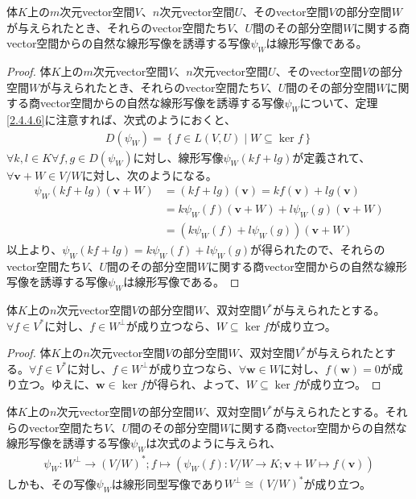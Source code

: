 \documentclass[dvipdfmx]{jsarticle}
\begin{document}
\begin{thm}\label{2.4.4.7}
体$K$上の$m$次元vector空間$V$、$n$次元vector空間$U$、そのvector空間$V$の部分空間$W$が与えられたとき、それらのvector空間たち$V$、$U$間のその部分空間$W$に関する商vector空間からの自然な線形写像を誘導する写像$\psi_{W}$は線形写像である。
\end{thm}
\begin{proof}
体$K$上の$m$次元vector空間$V$、$n$次元vector空間$U$、そのvector空間$V$の部分空間$W$が与えられたとき、それらのvector空間たち$V$、$U$間のその部分空間$W$に関する商vector空間からの自然な線形写像を誘導する写像$\psi_{W}$について、定理\ref{2.4.4.6}に注意すれば、次式のようにおくと、
\begin{align*}
D\left( \psi_{W} \right) = \left\{ f \in L(V,U) \middle| W \subseteq \ker f \right\}
\end{align*}
$\forall k,l \in K\forall f,g \in D\left( \psi_{W} \right)$に対し、線形写像$\psi_{W}(kf + lg)$が定義されて、$\forall\mathbf{v} + W \in {V}/{W}$に対し、次のようになる。
\begin{align*}
\psi_{W}(kf + lg)\left( \mathbf{v} + W \right) &= (kf + lg)\left( \mathbf{v} \right) = kf\left( \mathbf{v} \right) + lg\left( \mathbf{v} \right)\\
&= k\psi_{W}(f)\left( \mathbf{v} + W \right) + l\psi_{W}(g)\left( \mathbf{v} + W \right)\\
&= \left( k\psi_{W}(f) + l\psi_{W}(g) \right)\left( \mathbf{v} + W \right)
\end{align*}
以上より、$\psi_{W}(kf + lg) = k\psi_{W}(f) + l\psi_{W}(g)$が得られたので、それらのvector空間たち$V$、$U$間のその部分空間$W$に関する商vector空間からの自然な線形写像を誘導する写像$\psi_{W}$は線形写像である。
\end{proof}
\begin{thm}\label{2.4.4.8}
体$K$上の$n$次元vector空間$V$の部分空間$W$、双対空間$V^{*}$が与えられたとする。$\forall f \in V^{*}$に対し、$f \in W^{\bot}$が成り立つなら、$W \subseteq \ker f$が成り立つ。
\end{thm}
\begin{proof}
体$K$上の$n$次元vector空間$V$の部分空間$W$、双対空間$V^{*}$が与えられたとする。$\forall f \in V^{*}$に対し、$f \in W^{\bot}$が成り立つなら、$\forall\mathbf{w} \in W$に対し、$f\left( \mathbf{w} \right) = 0$が成り立つ。ゆえに、$\mathbf{w} \in \ker f$が得られ、よって、$W \subseteq \ker f$が成り立つ。
\end{proof}
\begin{thm}\label{2.4.4.9}
体$K$上の$n$次元vector空間$V$の部分空間$W$、双対空間$V^{*}$が与えられたとする。それらのvector空間たち$V$、$U$間のその部分空間$W$に関する商vector空間からの自然な線形写像を誘導する写像$\psi_{W}$は次式のように与えられ、
\begin{align*}
\psi_{W}:W^{\bot} \rightarrow \left( {V}/{W} \right)^{*};f \mapsto \left( \psi_{W}(f):{V}/{W} \rightarrow K;\mathbf{v} + W \mapsto f\left( \mathbf{v} \right) \right)
\end{align*}
しかも、その写像$\psi_{W}$は線形同型写像であり$W^{\bot} \cong \left( {V}/{W} \right)^{*}$が成り立つ。
\end{thm}
\end{document}
